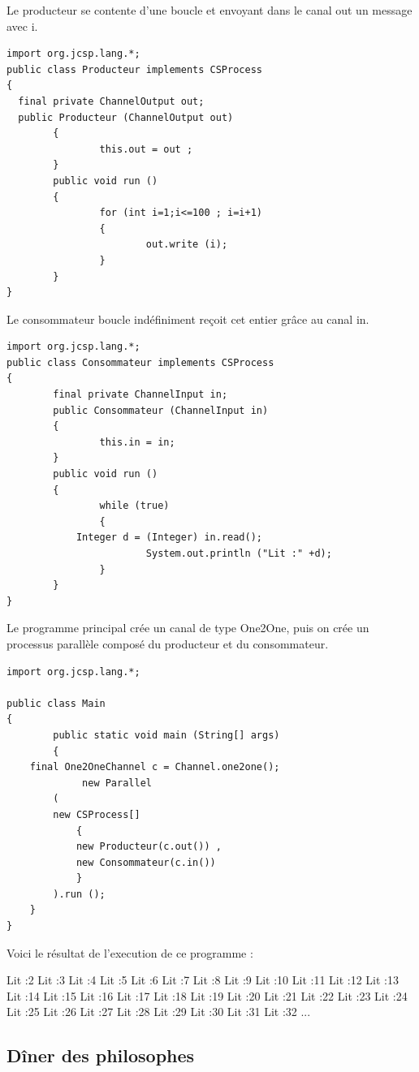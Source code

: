 \documentclass[a4paper,11pt,french]{report}
\begin{document}
Le producteur se contente d'une boucle et envoyant dans le canal out un message avec i. 

\begin{lstlisting}[frame=trBL,title={Producteurs-Consommateurs: Producteur.java}]
import org.jcsp.lang.*;
public class Producteur implements CSProcess
{
  final private ChannelOutput out;
  public Producteur (ChannelOutput out)
        {
                this.out = out ;
        }
        public void run ()
        {
                for (int i=1;i<=100 ; i=i+1)
                {
                        out.write (i);
                }
        }
}
\end{lstlisting}

Le consommateur boucle indéfiniment reçoit cet entier grâce au canal in.

\begin{lstlisting}[frame=trBL,title={Producteurs-Consommateurs: Consommateur.java}]
import org.jcsp.lang.*;
public class Consommateur implements CSProcess
{
        final private ChannelInput in;
        public Consommateur (ChannelInput in)
        {
                this.in = in;
        }
        public void run ()
        {
                while (true)
                {
			Integer d = (Integer) in.read();
                        System.out.println ("Lit :" +d);
                }
        }
}
\end{lstlisting}

Le programme principal crée un canal de type One2One, puis on crée un processus parallèle composé du producteur et du consommateur.

\begin{lstlisting}[frame=trBL,title={Producteurs-Consommateurs: Main.java}]
import org.jcsp.lang.*;

public class Main
{
        public static void main (String[] args)
        {
	final One2OneChannel c = Channel.one2one();
             new Parallel
		(
		new CSProcess[]
			{
			new Producteur(c.out()) ,
			new Consommateur(c.in())
			} 
		).run ();
	}
}
\end{lstlisting}

Voici le résultat de l'execution de ce programme :

Lit :2
Lit :3
Lit :4
Lit :5
Lit :6
Lit :7
Lit :8
Lit :9
Lit :10
Lit :11
Lit :12
Lit :13
Lit :14
Lit :15
Lit :16
Lit :17
Lit :18
Lit :19
Lit :20
Lit :21
Lit :22
Lit :23
Lit :24
Lit :25
Lit :26
Lit :27
Lit :28
Lit :29
Lit :30
Lit :31
Lit :32
...
 
\subsection{Dîner des philosophes}
\end{document}
